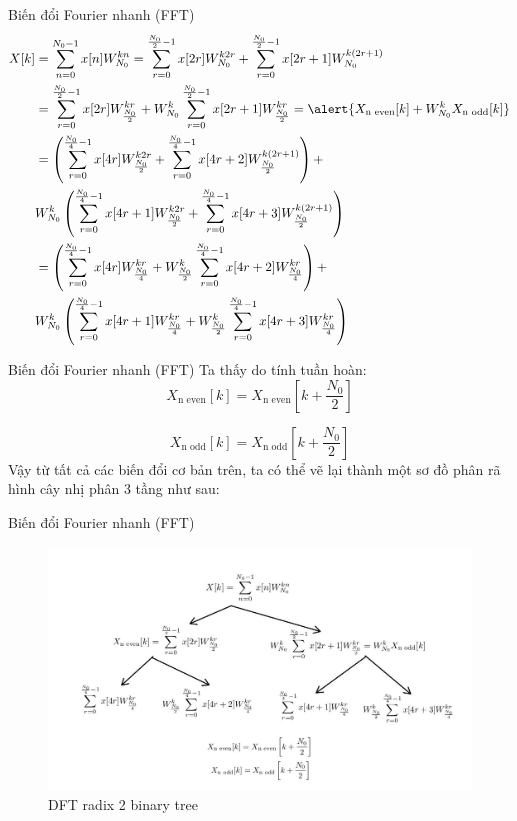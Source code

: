 \documentclass[8pt]{beamer}
\begin{document}
\begin{frame}{Biến đổi Fourier nhanh (FFT)}
\begin{equation*}
\begin{split}
	X[k]&=\sum_{n=0}^{N_{0}-1}x[n]W_{N_{0}}^{kn}=\sum_{r=0}^{\frac{N_{0}}{2}-1}x[2r]W_{N_{0}}^{k2r}+\sum_{r=0}^{\frac{N_{0}}{2}-1}x[2r+1]W_{N_{0}}^{k(2r+1)}\\
	    &=\sum_{r=0}^{\frac{N_{0}}{2}-1}x[2r]W_{\frac{N_{0}}{2}}^{kr}+W_{N_{0}}^{k}\sum_{r=0}^{\frac{N_{0}}{2}-1}x[2r+1]W_{\frac{N_{0}}{2}}^{kr}=\alert{X_{\text{n even}}[k]+W_{N_{0}}^{k}X_{\text{n odd}}[k]}\\
	    &=\left(\sum_{r=0}^{\frac{N_{0}}{4}-1}x[4r]W_{\frac{N_{0}}{2}}^{k2r}+\sum_{r=0}^{\frac{N_{0}}{4}-1}x[4r+2]W_{\frac{N_{0}}{2}}^{k(2r+1)}\right)+\\ &W_{N_{0}}^{k}\left(\sum_{r=0}^{\frac{N_{0}}{4}-1}x[4r+1]W_{\frac{N_{0}}{2}}^{k2r} +\sum_{r=0}^{\frac{N_{0}}{4}-1}x[4r+3]W_{\frac{N_{0}}{2}}^{k(2r+1)} \right)\\
	    &=\left(\sum_{r=0}^{\frac{N_{0}}{4}-1}x[4r]W_{\frac{N_{0}}{4}}^{kr}+W_{\frac{N_{0}}{2}}^{k}\sum_{r=0}^{\frac{N_{0}}{4}-1}x[4r+2]W_{\frac{N_{0}}{4}}^{kr}\right)+\\ &W_{N_{0}}^{k}\left(\sum_{r=0}^{\frac{N_{0}}{4}-1}x[4r+1]W_{\frac{N_{0}}{4}}^{kr}+W_{\frac{N_{0}}{2}}^{k}\sum_{r=0}^{\frac{N_{0}}{4}-1}x[4r+3]W_{\frac{N_{0}}{4}}^{kr}\right)
\end{split}
\end{equation*}
\end{frame}
\begin{frame}{Biến đổi Fourier nhanh (FFT)}
Ta thấy do tính tuần hoàn:
$$X_{\text{n even}}[k]=X_{\text{n even}}\left[k+\frac{N_{0}}{2}\right]$$

$$X_{\text{n odd}}[k]=X_{\text{n odd}}\left[k+\frac{N_{0}}{2}\right]$$
Vậy từ tất cả các biến đổi cơ bản trên, ta có thể vẽ lại thành một sơ đồ phân rã hình cây nhị phân 3 tầng như sau:
\end{frame}
\begin{frame}{Biến đổi Fourier nhanh (FFT)}
\begin{figure}[h]
			\includegraphics[width=1.1\textwidth]{4.jpg}

			\caption{DFT radix 2 binary tree}			\label{fig:re4}

		\end{figure}


\end{frame}
\end{document}
